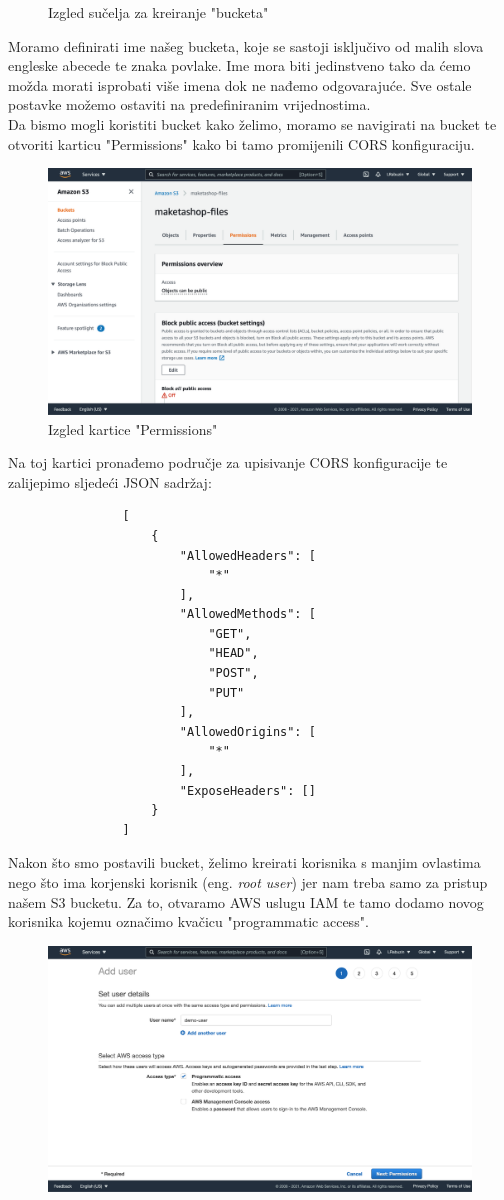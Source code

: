 {\begin{figure}[H]
				\caption{Izgled sučelja za kreiranje "bucketa"}
				\label{fig:aws2}
			\end{figure}
			Moramo definirati ime našeg bucketa, koje se sastoji isključivo od malih slova engleske abecede te znaka povlake. Ime mora biti jedinstveno tako da ćemo možda morati isprobati više imena dok ne nađemo odgovarajuće. Sve ostale postavke možemo ostaviti na predefiniranim vrijednostima.\\
			Da bismo mogli koristiti bucket kako želimo, moramo se navigirati na bucket te otvoriti karticu "Permissions" kako bi tamo promijenili CORS konfiguraciju.
			\begin{figure}[H]
				\centering
				\includegraphics[width=1\linewidth]{slike/AWS3}
				\caption{Izgled kartice "Permissions"}
				\label{fig:aws3}
			\end{figure}
			Na toj kartici pronađemo područje za upisivanje CORS konfiguracije te zalijepimo sljedeći JSON sadržaj:
			\begin{verbatim}
				[
					{
						"AllowedHeaders": [
							"*"
						],
						"AllowedMethods": [
							"GET",
							"HEAD",
							"POST",
							"PUT"
						],
						"AllowedOrigins": [
							"*"
						],
						"ExposeHeaders": []
					}
				]
			\end{verbatim}
			Nakon što smo postavili bucket, želimo kreirati korisnika s manjim ovlastima nego što ima korjenski korisnik (eng. \textit{root user}) jer nam treba samo za pristup našem S3 bucketu. Za to, otvaramo AWS uslugu IAM te tamo dodamo novog korisnika kojemu označimo kvačicu "programmatic access".
			\begin{figure}[H]
				\centering
				\includegraphics[width=1\linewidth]{slike/AWS4}

\end{figure}}
